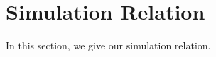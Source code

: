 
\section{Simulation Relation}
\label{sec:simulation relation} 

In this section, we give our simulation relation. 



